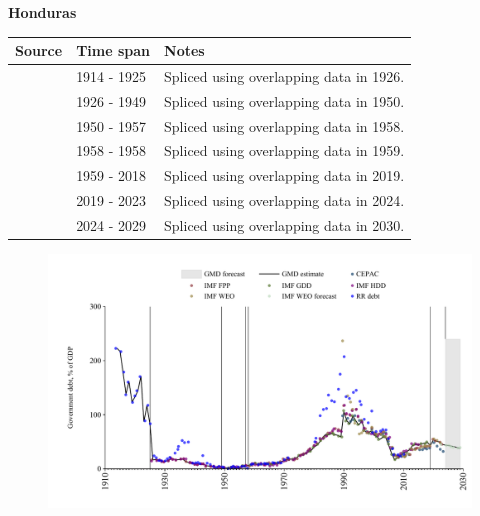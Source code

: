 \documentclass[12pt,a4paper,landscape]{article}
\begin{document}
\begin{adjustbox}{max totalsize={\paperwidth}{\paperheight},center}
\begin{minipage}[t][\textheight][t]{\textwidth}
\vspace*{0.5cm}
{}
\begin{center}
{\Large\bfseries Honduras}
\end{center}
\vspace{0.5cm}
\begin{table}[H]
\centering
\small
\begin{tabular}{|l|l|l|}
\hline
\textbf{Source} & \textbf{Time span} & \textbf{Notes} \\
\hline
\rowcolor{white}\cite{RR_debt}& 1914 - 1925 &Spliced using overlapping data in 1926.\\
\rowcolor{lightgray}\cite{IMF_FPP}& 1926 - 1949 &Spliced using overlapping data in 1950.\\
\rowcolor{white}\cite{IMF_GDD}& 1950 - 1957 &Spliced using overlapping data in 1958.\\
\rowcolor{lightgray}\cite{IMF_FPP}& 1958 - 1958 &Spliced using overlapping data in 1959.\\
\rowcolor{white}\cite{IMF_GDD}& 1959 - 2018 &Spliced using overlapping data in 2019.\\
\rowcolor{lightgray}\cite{IMF_FPP}& 2019 - 2023 &Spliced using overlapping data in 2024.\\
\rowcolor{white}\cite{IMF_WEO_forecast}& 2024 - 2029 &Spliced using overlapping data in 2030.\\
\hline
\end{tabular}
\end{table}
\begin{figure}[H]
\centering
\includegraphics[width=\textwidth,height=0.6\textheight,keepaspectratio]{graphs/HND_govdebt_GDP.pdf}
\end{figure}
\end{minipage}
\end{adjustbox}
\end{document}
